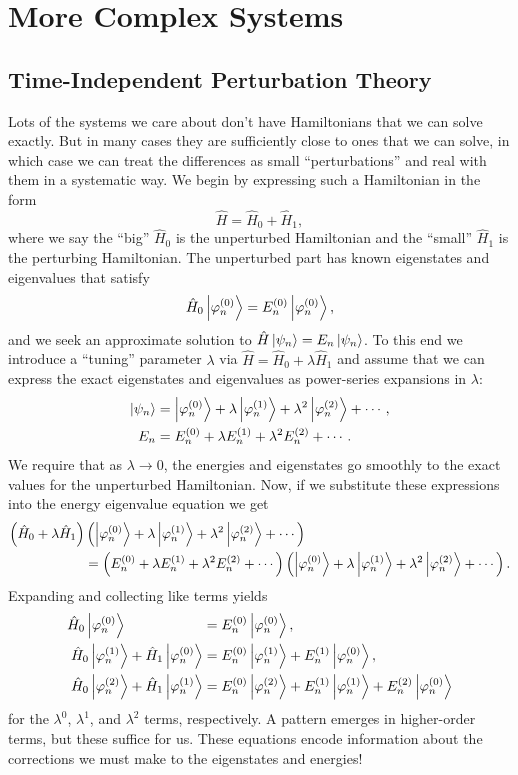 \documentclass[../p116main.tex]{subfiles}
\begin{document}
\chapter{More Complex Systems}
\section{Time-Independent Perturbation Theory}
Lots of the systems we care about don't have Hamiltonians that we can solve exactly.
But in many cases they are sufficiently close to ones that we can solve, in which case we can treat the differences as small ``perturbations'' and real with them in a systematic way.
We begin by expressing such a Hamiltonian in the form
\[ \hat H = \hat H_0 + \hat H_1, \]
where we say the ``big'' $\hat H_0$ is the unperturbed Hamiltonian and the ``small'' $\hat H_1$ is the perturbing Hamiltonian.
The unperturbed part has known eigenstates and eigenvalues that satisfy
\[ \hat H_0 \left| \varphi_n^{(0)} \right> = E_n^{(0)} \left| \varphi_n^{(0)} \right>, \]
and we seek an approximate solution to $\hat H \left| \psi_n \right> = E_n \left| \psi_n \right>$.
To this end we introduce a ``tuning'' parameter $\lambda$ via $\hat H = \hat H_0 + \lambda \hat H_1$ and assume that we can express the exact eigenstates and eigenvalues as power-series expansions in $\lambda$:  \vspace{-10pt}
\begin{align*}
    \left| \psi_n \right> &= \left| \varphi_n^{(0)} \right> + \lambda \left| \varphi_n^{(1)} \right> + \lambda^2 \left| \varphi_n^{(2)} \right> + \cdots, \\
    E_n &= E_n^{(0)} + \lambda E_n^{(1)} + \lambda^2 E_n^{(2)} + \cdots.
\end{align*}
We require that as $\lambda \to 0$, the energies and eigenstates go smoothly to the exact values for the unperturbed Hamiltonian.
Now, if we substitute these expressions into the energy eigenvalue equation we get
\begin{align*}
    \left( \hat H_0 + \lambda \hat H_1 \right) & \left( \left| \varphi_n^{(0)} \right> + \lambda \left| \varphi_n^{(1)} \right> + \lambda^2 \left| \varphi_n^{(2)} \right> + \cdots \right) \\
    &= \left( E_n^{(0)} + \lambda E_n^{(1)} + \lambda^2 E_n^{(2)} + \cdots \right) \left( \left| \varphi_n^{(0)} \right> + \lambda \left| \varphi_n^{(1)} \right> + \lambda^2 \left| \varphi_n^{(2)} \right> + \cdots \right).
\end{align*}
Expanding and collecting like terms yields
\begin{align*}
    \hat H_0 \ket{\varphi_n^{(0)}} \phantom{\;\; + \hat H_0 \ket{\varphi_n^{(0)}}} &= E_n^{(0)} \ket{\varphi_n^{(0)}}, \\
    \hat H_0 \ket{\varphi_n^{(1)}} + \hat H_1 \ket{\varphi_n^{(0)}} &= E_n^{(0)} \ket{\varphi_n^{(1)}} + E_n^{(1)} \ket{\varphi_n^{(0)}}, \\
    \hat H_0 \ket{\varphi_n^{(2)}} + \hat H_1 \ket{\varphi_n^{(1)}} &= E_n^{(0)} \ket{\varphi_n^{(2)}} + E_n^{(1)} \ket{\varphi_n^{(1)}} + E_n^{(2)} \ket{\varphi_n^{(0)}}
\end{align*}
for the $\lambda^{0}$, $\lambda^{1}$, and $\lambda^2$ terms, respectively.
A pattern emerges in higher-order terms, but these suffice for us.
These equations encode information about the corrections we must make to the eigenstates and energies!
\end{document}
